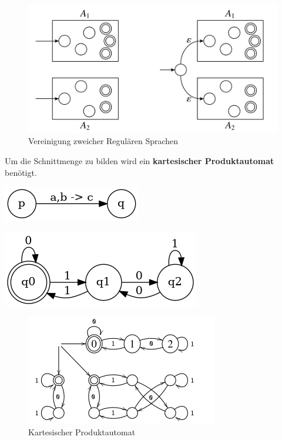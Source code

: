 \documentclass[11pt,twoside,landscape]{article}
\begin{document}
\begin{multicols}{3}
\begin{figure}[htbp]
\centering
\includegraphics[width=.9\linewidth]{static/img/autospr/regulary_lang_cup.png}
\caption{Vereinigung zweicher Regulären Sprachen}
\end{figure}

Um die Schnittmenge zu bilden wird ein \textbf{kartesischer Produktautomat} benötigt.

\begin{center}
\includegraphics[width=.9\linewidth]{static/img/autospr/even_zero_dea.png}
\end{center}

\begin{center}
\includegraphics[width=.9\linewidth]{static/img/autospr/divide_by_3_dea.png}
\end{center}

\begin{figure}[htbp]
\centering
\includegraphics[width=.9\linewidth]{static/img/autospr/kartesischer_automata.png}
\caption{Kartesischer Produktautomat}
\end{figure}

\end{multicols}
\end{document}
